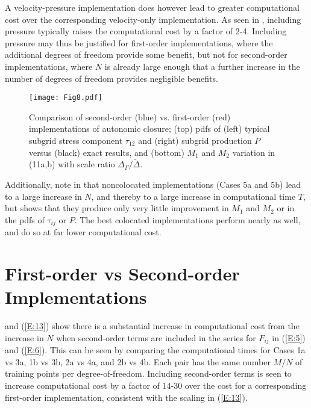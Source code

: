 A velocity-pressure implementation does however lead to greater computational cost over the corresponding velocity-only implementation. As seen in , including pressure typically raises the computational cost by a factor of 2-4. Including pressure may thus be justified for first-order implementations, where the additional degrees of freedom provide some benefit, but not for second-order implementations, where $N$ is already large enough that a further increase in the number of degrees of freedom provides negligible benefits.

%
\begin{figure}
	\centering \hspace{-1.0cm}
	\texttt{[image: Fig8.pdf]}
	\caption{ Comparison of second-order (blue) vs. first-order (red) implementations of autonomic closure; (top) pdfs of (left) typical subgrid stress component $\tau_{12}$ and (right) subgrid production $P$ versus (black) exact results, and (bottom) $M_1$ and $M_2$ variation in (11a,b) with scale ratio $\Delta_{\Gamma}/\widetilde{\Delta}$.}
	\label{F:8}
\end{figure}
%

Additionally, note in  that noncolocated implementations (Cases 5a and 5b) lead to a large increase in $N$, and thereby to a large increase in computational time $T$, but  shows that they produce only very little improvement in  $M_1$ and $M_2$  or in the pdfs of  $\tau_{ij}$ or $P$. The best colocated implementations perform nearly as well, and do so at far lower computational cost.

\section{First-order vs Second-order Implementations}
\label{sec:IVD}

 and (\ref{E:13}) show there is a substantial increase in computational cost from the increase in $N$ when second-order terms are included in the  series for  $F_{ij}$ in (\ref{E:5}) and (\ref{E:6}). This can be seen by comparing the computational times for Cases 1a vs 3a, 1b vs 3b, 2a vs 4a, and 2b vs 4b. Each pair has the same number  $M/N$ of training points per degree-of-freedom. Including second-order terms is seen to increase computational cost by a factor of 14-30 over the cost for a corresponding first-order implementation, consistent with the scaling in (\ref{E:13}).  



